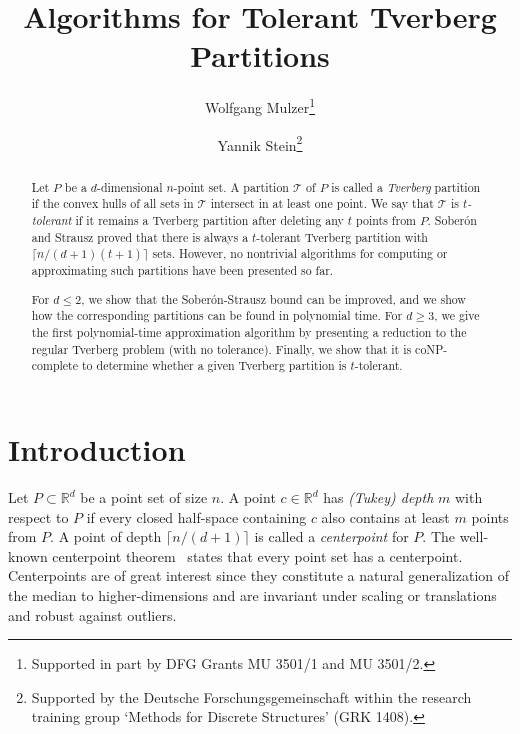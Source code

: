 \documentclass[oribibl,envcountsame,envcountsect]{llncs}
\title{Algorithms for Tolerant Tverberg Partitions}
\author{Wolfgang Mulzer\thanks{Supported in part by DFG Grants MU 3501/1 and MU 3501/2.} \and Yannik Stein\thanks{
    Supported by the Deutsche Forschungsgemeinschaft within the research
    training group `Methods for Discrete Structures' (GRK 1408).
    }
}
\institute{ Institut f\"ur Informatik, Freie Universit\"at Berlin\\
            Takustr. 9, 14195 Berlin, Germany\\
            \email{\{mulzer, yannikstein\}@inf.fu-berlin.de}
          }
\newcommand{\real}{\mathbb{R}}
\begin{document}
\maketitle

\begin{abstract}
  Let $P$ be a $d$-dimensional $n$-point set. A partition $\mathcal{T}$ of $P$
  is called a \emph{Tverberg} partition if the convex hulls of all sets
  in $\mathcal{T}$ intersect in at least one point. We say that $\mathcal{T}$ is
  \emph{$t$-tolerant} if it remains a Tverberg partition after deleting
  any $t$ points from $P$. Sober\'{o}n and Strausz proved that there is always a
  $t$-tolerant Tverberg partition with $\lceil n / (d+1)(t+1) \rceil$ sets.
  However, no nontrivial algorithms for computing or approximating
  such partitions have been presented so far.

  For $d \leq 2$, we show that the Sober\'{o}n-Strausz bound can be improved,
  and we show how the corresponding partitions can be found in polynomial time.
  For $d \geq 3$, we give the first polynomial-time approximation algorithm
  by presenting a reduction to the regular Tverberg problem (with no
  tolerance).
  Finally, we show that it is coNP-complete to determine whether a given
  Tverberg partition is $t$-tolerant.

\end{abstract}

\section{Introduction}
Let $P\subset\real^d$ be a point set of size $n$. A point $c\in\real^d$ has
\emph{(Tukey) depth}  $m$ with respect to $P$ if every closed half-space containing
$c$ also contains at least $m$ points from $P$. A point of depth $\lceil n/(d+1)
\rceil$ is called a \emph{centerpoint} for $P$. The well-known centerpoint
theorem~\cite{Rado1946} states that every point set has a centerpoint. Centerpoints
are of great interest since they constitute a natural generalization of the median to
higher-dimensions and are invariant under scaling or translations
and robust against outliers.
\end{document}
